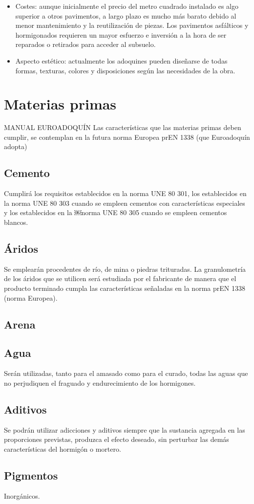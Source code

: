 \begin{itemize}
\item Costes: aunque inicialmente el precio del metro cuadrado instalado es algo superior a otros pavimentos, a largo plazo es mucho más barato debido al menor mantenimiento y la reutilización de piezas. Los pavimentos asfálticos y hormigonados requieren un mayor esfuerzo e inversión a la hora de ser reparados o retirados para acceder al subsuelo.

\item Aspecto estético: actualmente los adoquines pueden diseñarse de todas formas, texturas, colores y disposiciones según las necesidades de la obra.
\end{itemize}

\section{Materias primas}
MANUAL EUROADOQUÍN
Las características que las materias primas deben cumplir, se contemplan en la futura norma Europea prEN 1338 (que Euroadoquín adopta)
\subsection{Cemento}
Cumplirá los requisitos establecidos en la norma UNE 80 301, los establecidos en la norma UNE 80 303 cuando se empleen cementos con características especiales y los establecidos en la
￼norma UNE 80 305 cuando se empleen cementos blancos.
\subsection{Áridos}
Se emplearán procedentes de río, de mina o piedras trituradas. La granulometría de los áridos que se utilicen será estudiada por el fabricante de manera que el producto terminado cumpla las características señaladas en la norma prEN 1338 (norma Europea).
\subsection{Arena}
\subsection{Agua}
Serán utilizadas, tanto para el amasado como para el curado, todas las aguas que no perjudiquen el fraguado y endurecimiento de los hormigones.
\subsection{Aditivos}
Se podrán utilizar adicciones y aditivos siempre que la sustancia agregada en las proporciones previstas, produzca el efecto deseado, sin perturbar las demás características del hormigón o mortero.
\subsection{Pigmentos}
Inorgánicos.
